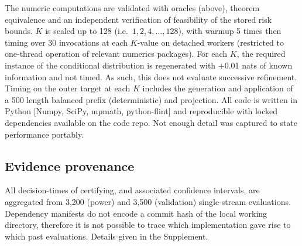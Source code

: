 The numeric computations are validated with oracles (above), theorem equivalence and an independent verification of feasibility of the stored risk bounds. $K$ is scaled up to 128 (i.e.\ $1,2,4,\ldots,128$), with warmup 5 times then timing over 30 invocations at each $K$-value on detached workers (restricted to one-thread operation of relevant numerics packages). For each $K$, the required instance of the conditional distribution is regenerated with +0.01 nats of known information and not timed. As such, this does not evaluate successive refinement. Timing on the outer target at each $K$ includes the generation and application of a 500 length balanced prefix (deterministic) and projection. All code is written in Python [Numpy, SciPy, mpmath, python-flint] and reproducible with locked dependencies available on the code repo. Not enough detail was captured to state performance portably.

\subsection{Evidence provenance}\label{sec:provenance} 
All decision-times of certifying, and associated confidence intervals, are aggregated from 3,200 (power) and 3,500 (validation) single-stream evaluations. Dependency manifests do not encode a commit hash of the local working directory, therefore it is not possible to trace which implementation gave rise to which past evaluations. Details given in the Supplement. 